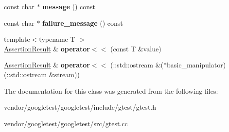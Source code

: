 \begin{DoxyCompactItemize}
\mbox{\label{classtesting_1_1_assertion_result_a33c14dafd28e3393c841e03f4b70a017}} 
const char $\ast$ {\bfseries message} () const
\item 
\mbox{\label{classtesting_1_1_assertion_result_aa38908d5a48c912434a80c8725f52583}} 
const char $\ast$ {\bfseries failure\+\_\+message} () const
\item 
\mbox{\label{classtesting_1_1_assertion_result_a3230efa81aafe7c61f5fb878cfa39e91}} 
{\footnotesize template$<$typename T $>$ }\\\mbox{\hyperlink{classtesting_1_1_assertion_result}{Assertion\+Result}} \& {\bfseries operator$<$$<$} (const T \&value)
\item 
\mbox{\label{classtesting_1_1_assertion_result_a43ae8a260843ce2ff3dc9af262672b8b}} 
\mbox{\hyperlink{classtesting_1_1_assertion_result}{Assertion\+Result}} \& {\bfseries operator$<$$<$} (\+::std\+::ostream \&($\ast$basic\+\_\+manipulator)(\+::std\+::ostream \&stream))
\end{DoxyCompactItemize}


The documentation for this class was generated from the following files\+:\begin{DoxyCompactItemize}
\item 
vendor/googletest/googletest/include/gtest/gtest.\+h\item 
vendor/googletest/googletest/src/gtest.\+cc\end{DoxyCompactItemize}

